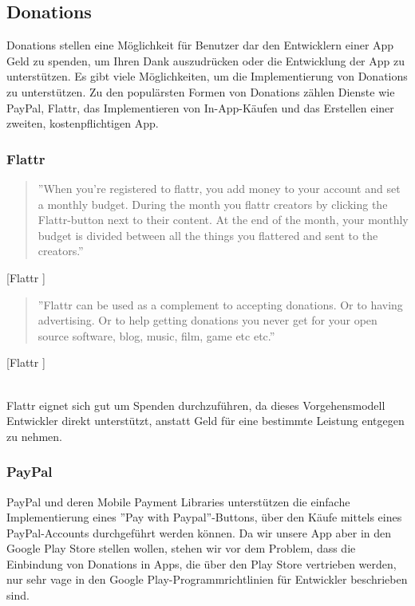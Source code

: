 \documentclass[FIPLY_base.tex]{subfiles}
\begin{document}
\subsection{Donations}
Donations stellen eine Möglichkeit für Benutzer dar den Entwicklern einer App Geld zu spenden, um Ihren Dank auszudrücken oder die Entwicklung der App zu unterstützen.
Es gibt viele Möglichkeiten, um die Implementierung von Donations zu unterstützen.\newline
Zu den populärsten Formen von Donations zählen Dienste wie PayPal, Flattr, das Implementieren von In-App-Käufen und das Erstellen einer zweiten, kostenpflichtigen App. %


\subsubsection{Flattr}
\begin{quote}
''When you're registered to flattr, you add money to your account and set a monthly budget. During the month you flattr creators by clicking the Flattr-button next to their content. At the end of the month, your monthly budget is divided between all the things you flattered and sent to the creators.''
\end{quote}[Flattr \cite{flattr}]

\begin{quote}
''Flattr can be used as a complement to accepting donations. Or to having advertising. Or to help getting donations you never get for your open source software, blog, music, film, game etc etc.''
\end{quote}[Flattr \cite{flattr}]

\ \\
Flattr eignet sich gut um Spenden durchzuführen, da dieses Vorgehensmodell Entwickler direkt unterstützt, anstatt Geld für eine bestimmte Leistung entgegen zu nehmen. 

\newpage
\subsubsection{PayPal}
PayPal und deren Mobile Payment Libraries unterstützen die einfache Implementierung eines ''Pay with Paypal''-Buttons, über den Käufe mittels eines PayPal-Accounts durchgeführt werden können.
Da wir unsere App aber in den Google Play Store stellen wollen, stehen wir vor dem Problem, dass die Einbindung von Donations in Apps, die über den Play Store vertrieben werden, nur sehr vage in den Google Play-Programmrichtlinien für Entwickler beschrieben sind.
\end{document}
